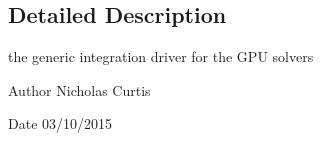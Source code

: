 \subsection{Detailed Description}
the generic integration driver for the G\+PU solvers 

\begin{DoxyAuthor}{Author}
Nicholas Curtis 
\end{DoxyAuthor}
\begin{DoxyDate}{Date}
03/10/2015 
\end{DoxyDate}
